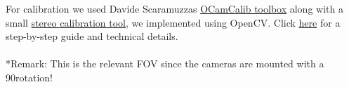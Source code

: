For calibration we used Davide Scaramuzzas
\href{https://sites.google.com/site/scarabotix/ocamcalib-toolbox}{OCamCalib toolbox} along with a small
\href{https://github.com/ands/OculusMeetsAR/tree/master/Hardware}{stereo calibration tool}, we implemented using OpenCV. Click
\hyperref[sec:stereo_calibration]{here} for a step-by-step guide and technical details.
\\
\\
*Remark: This is the relevant FOV since the cameras are mounted with a 90\textdegree rotation!